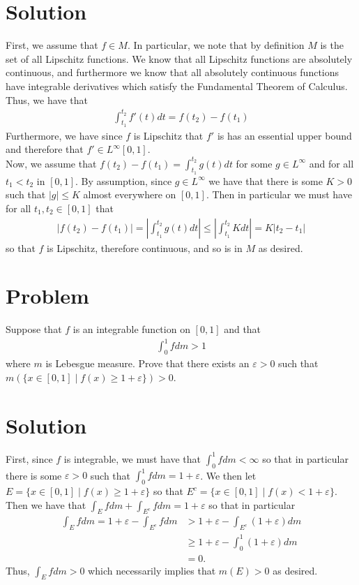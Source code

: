 \documentclass{article}
\begin{document}
\section*{Solution}
First, we assume that $f\in M$.  In particular, we note that by definition $M$ is the set of all Lipschitz functions.  We know that all Lipschitz functions are absolutely continuous, and furthermore we know that all absolutely continuous functions have integrable derivatives which satisfy the Fundamental Theorem of Calculus.  Thus, we have that
\begin{align*}
\int_{t_1}^{t_2}f'(t)dt=f(t_2)-f(t_1)
\end{align*}
Furthermore, we have since $f$ is Lipschitz that $f'$ is has an essential upper bound and therefore that $f'\in L^\infty[0,1]$.\\

\noindent Now, we assume that $f(t_2)-f(t_1)=\int_{t_1}^{t_2}g(t)dt$ for some $g\in L^\infty$ and for all $t_1<t_2$ in $[0,1]$.  By assumption, since $g\in L^\infty$ we have that there is some $K>0$ such that $|g|\leq K$ almost everywhere on $[0,1]$.  Then in particular we must have for all $t_1,t_2\in[0,1]$ that
\begin{align*}
|f(t_2)-f(t_1)|=\left|\int_{t_1}^{t_2}g(t)dt\right|\leq\left|\int_{t_1}^{t_2}Kdt\right|=K|t_2-t_1|
\end{align*}
so that $f$ is Lipschitz, therefore continuous, and so is in $M$ as desired.

\section*{Problem}
Suppose that $f$ is an integrable function on $[0,1]$ and that
\begin{align*}
\int_0^1fdm>1
\end{align*}
where $m$ is Lebesgue measure.  Prove that there exists an $\varepsilon>0$ such that $m(\{x\in[0,1]\mid f(x)\geq1+\varepsilon\})>0$.

\section*{Solution}
First, since $f$ is integrable, we must have that $\int_0^1fdm<\infty$ so that in particular there is some $\varepsilon>0$ such that $\int_0^1fdm=1+\varepsilon$.  We then let $E=\{x\in[0,1]\mid f(x)\geq 1+\varepsilon\}$ so that $E^c=\{x\in[0,1]\mid f(x)<1+\varepsilon\}$.  Then we have that $\int_Efdm+\int_{E^c}fdm=1+\varepsilon$ so that in particular
\begin{align*}
\int_{E}fdm=1+\varepsilon-\int_{E^c}fdm&>1+\varepsilon-\int_{E^c}(1+\varepsilon)dm\\
&\geq1+\varepsilon-\int_0^1(1+\varepsilon)dm\\
&=0.
\end{align*}
Thus, $\int_{E}fdm>0$ which necessarily implies that $m(E)>0$ as desired.
\end{document}
